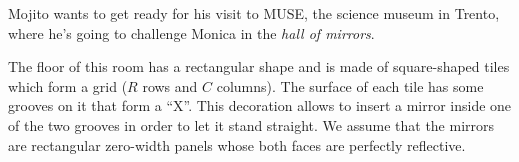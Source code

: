 \usepackage{xcolor}
\usepackage{afterpage}
\usepackage{pifont,mdframed}
\usepackage[bottom]{footmisc}
\usepackage{caption}



\renewcommand{\inputfile}{\texttt{stdin}}
\renewcommand{\outputfile}{\texttt{stdout}}
\makeatletter
\renewcommand{\this@inputfilename}{\texttt{stdin}}
\renewcommand{\this@outputfilename}{\texttt{stdout}}
\makeatother

\newenvironment{warning}
  {\par\begin{mdframed}[linewidth=2pt,linecolor=gray]%
    \begin{list}{}{\leftmargin=1cm
                   \labelwidth=\leftmargin}\item[\Large\ding{43}]}
  {\end{list}\end{mdframed}\par}


\newenvironment{todoenv}
  {\par\begin{mdframed}[linewidth=2pt,linecolor=red]%
	\begin{list}{}{\leftmargin=1cm
		           \labelwidth=\leftmargin}\item[\Large\ding{169}]}
  {\end{list}\end{mdframed}\par}

\newcommand{\todo}[1]{\begin{todoenv}
	TODO: #1
\end{todoenv}}


Mojito wants to get ready for his visit to MUSE, the science museum in Trento, where he's going to challenge Monica in the \emph{hall of mirrors}.

The floor of this room has a rectangular shape and is made of square-shaped tiles which form a grid ($R$ rows and $C$ columns).
The surface of each tile has some grooves on it that form a ``X''. This decoration allows to insert a mirror inside one of the two grooves in order to let it stand straight. We assume that the mirrors are rectangular zero-width panels whose both faces are perfectly reflective.

